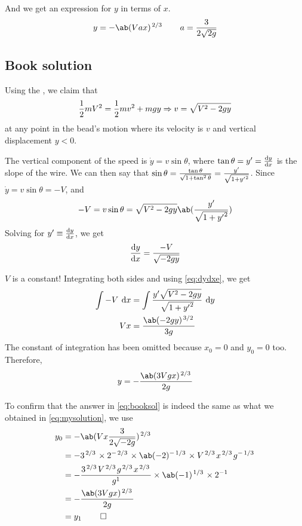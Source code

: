 And we get an expression for \(y\) in terms of \(x\).
\begin{equation}
  y = -\ab(Vax)^{\lf{2}{3}}\qquad a = \f{3}{2\sqrt{2g}}
  \label{eq:mysolution}
\end{equation}

\subsection{Book solution}
Using the , we claim that
\begin{equation*}
\frac{1}{2}mV^2 = \frac{1}{2}mv^2 + mgy \Rightarrow v = \sqrt{V^2-2gy}
\end{equation*}
at any point in the bead's motion where its velocity is \(v\) and vertical displacement
\(y < 0\).

The vertical component of the speed is \(\dot{y}=v\sin\theta\), where
\(\tan\theta=y'=\odv{y}{x}\) is the slope of the wire. We can then say that
\(\sin\theta=\frac{\tan\theta}{\sqrt{1+\tan^2\theta}}=\frac{y'}{\sqrt{1+{y'}^2}}\). Since \(\dot{y}=v\sin\theta=-V\), and
\begin{equation*}
-V = v\sin\theta=\sqrt{V^2-2gy}\ab(\f{y'}{\sqrt{1+{y'}^2}})
\end{equation*}
Solving for \(y'\equiv\odv{y}{x}\), we get
\begin{equation}
\odv{y}{x} = \f{-V}{\sqrt{-2gy}}
\label{eq:dydxe}
\end{equation}

\(V\) is a constant! Integrating both sides and using \cref{eq:dydxe}, we get
\begin{align*}
\int-V\:\odif{x} &= \int \f{y'\sqrt{V^2-2gy}}{\sqrt{1+{y'}^2}}\:\odif{y} \\
Vx &= \f{\ab(-2gy)^{\lf{3}{2}}}{3g}
\end{align*}
The constant of integration has been omitted because \(x_0 = 0\) and \(y_0=0\) too.
Therefore,
\begin{equation}
y = -\f{\ab(3Vgx)^{\lf{2}{3}}}{2g}
  \label{eq:booksol}
\end{equation}

To confirm that the answer in \cref{eq:booksol} is indeed the same as what we obtained in 
\cref{eq:mysolution}, we use
\begin{align*}
y_0 &= -\ab(Vx \f{3}{2\sqrt{-2g}})^{\lf{2}{3}} \\
&= -3^{\lf{2}{3}} \times 2^{-\lf{2}{3}} \times \ab(-2)^{-\lf{1}{3}}\times V^{\lf{2}{3}} x^{\lf{2}{3}} g^{-\lf{1}{3}} \\
&= -\f{3^{\lf{2}{3}} V^{\lf{2}{3}} g^{\lf{2}{3}} x^{\lf{2}{3}}}{g^1} \times \ab(-1)^{\lf{1}{3}} \times 2^{-1} \\
&= -\f{\ab(3Vgx)^{\lf{2}{3}}}{2g} \\
&= y_1 \:\qed\\
\end{align*}